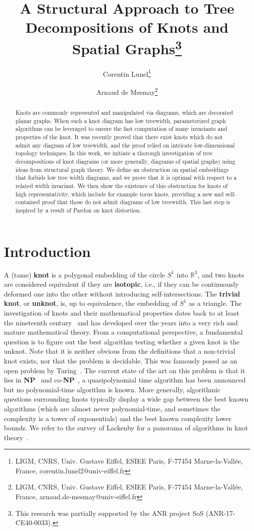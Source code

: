 \documentclass[11pt,a4paper]{article}
\title{A Structural Approach to Tree Decompositions of Knots and Spatial Graphs\thanks{This research was partially supported by the ANR project SoS (ANR-17-CE40-0033).}}
\author{Corentin Lunel\thanks{LIGM, CNRS, Univ. Gustave Eiffel, ESIEE Paris, F-77454 Marne-la-Vall\'ee, France, corentin.lunel2@univ-eiffel.fr} \and Arnaud de Mesmay\thanks{LIGM, CNRS, Univ. Gustave Eiffel, ESIEE Paris, F-77454 Marne-la-Vall\'ee, France, arnaud.de-mesmay@univ-eiffel.fr}}
\date{}
\begin{document}
\maketitle

\begin{abstract}
  Knots are commonly represented and manipulated via diagrams, which are decorated planar graphs. When such a knot diagram has low treewidth, parameterized graph algorithms can be leveraged to ensure the fast computation of many invariants and properties of the knot. It was recently proved that there exist knots which do not admit any diagram of low treewidth, and the proof relied on intricate low-dimensional topology techniques. In this work, we initiate a thorough investigation of tree decompositions of knot diagrams (or more generally, diagrams of spatial graphs) using ideas from structural graph theory. We define an obstruction on spatial embeddings that forbids low tree width diagrams, and we prove that it is optimal with respect to a related width invariant. We then show the existence of this obstruction for knots of high representativity, which include for example torus knots, providing a new and self-contained proof that those do not admit diagrams of low treewidth. This last step is inspired by a result of Pardon on knot distortion.
\end{abstract}


\section{Introduction}

A (tame) \textbf{knot} is a polygonal embedding of the circle $S^1$ into $\mathbb{R}^3$, and two knots are considered equivalent if they are \textbf{isotopic}, i.e., if they can be continuously deformed one into the other without introducing self-intersections. The \textbf{trivial knot}, or \textbf{unknot}, is, up to equivalence, the embedding of $S^1$ as a triangle. The investigation of knots and their mathematical properties dates back to at least the nineteenth century~\cite{knotbook} and has developed over the years into a very rich and mature mathematical theory. From a computational perspective, a fundamental question is to figure out the best algorithm testing whether a given knot is the unknot. Note that it is neither obvious from the definitions that a non-trivial knot exists, nor that the problem is decidable. This was famously posed as an open problem by Turing~\cite{turing}. The current state of the art on this problem is that it lies in \textbf{NP}~\cite{Hass_trivial_NP} and co-\textbf{NP}~\cite{Lackenby_co-NP}, a quasipolynomial time algorithm has been announced~\cite{Lackenby_talk} but no polynomial-time algorithm is known. More generally, algorithmic questions surrounding knots typically display a wide gap between the best known algorithms (which are almost never polynomial-time, and sometimes the complexity is a tower of exponentials) and the best known complexity lower bounds. We refer to the survey of Lackenby for a panorama of algorithms in knot theory~\cite{Lackenby_Algorithms}.
\end{document}

